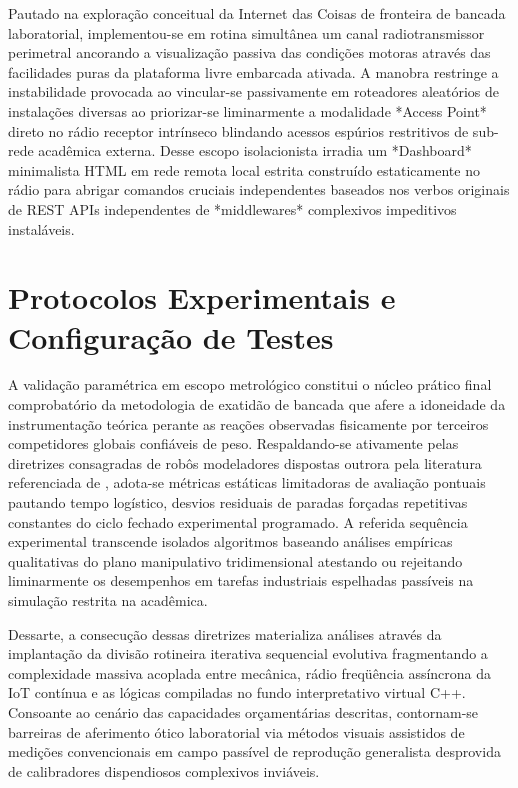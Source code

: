 Pautado na exploração conceitual da Internet das Coisas de fronteira de bancada laboratorial, implementou-se em rotina simultânea um canal radiotransmissor perimetral ancorando a visualização passiva das condições motoras através das facilidades puras da plataforma livre embarcada ativada. A manobra restringe a instabilidade provocada ao vincular-se passivamente em roteadores aleatórios de instalações diversas ao priorizar-se liminarmente a modalidade *Access Point* direto no rádio receptor intrínseco blindando acessos espúrios restritivos de sub-rede acadêmica externa. Desse escopo isolacionista irradia um *Dashboard* minimalista HTML em rede remota local estrita construído estaticamente no rádio para abrigar comandos cruciais independentes baseados nos verbos originais de REST APIs independentes de *middlewares* complexivos impeditivos instaláveis.

\section{Protocolos Experimentais e Configuração de Testes}

A validação paramétrica em escopo metrológico constitui o núcleo prático final comprobatório da metodologia de exatidão de bancada que afere a idoneidade da instrumentação teórica perante as reações observadas fisicamente por terceiros competidores globais confiáveis de peso. Respaldando-se ativamente pelas diretrizes consagradas de robôs modeladores dispostas outrora pela literatura referenciada de , adota-se métricas estáticas limitadoras de avaliação pontuais pautando tempo logístico, desvios residuais de paradas forçadas repetitivas constantes do ciclo fechado experimental programado. A referida sequência experimental transcende isolados algoritmos baseando análises empíricas qualitativas do plano manipulativo tridimensional atestando ou rejeitando liminarmente os desempenhos em tarefas industriais espelhadas passíveis na simulação restrita na acadêmica.

Dessarte, a consecução dessas diretrizes materializa análises através da implantação da divisão rotineira iterativa sequencial evolutiva fragmentando a complexidade massiva acoplada entre mecânica, rádio freqüência assíncrona da IoT contínua e as lógicas compiladas no fundo interpretativo virtual C++. Consoante ao cenário das capacidades orçamentárias descritas, contornam-se barreiras de aferimento ótico laboratorial via métodos visuais assistidos de medições convencionais em campo passível de reprodução generalista desprovida de calibradores dispendiosos complexivos inviáveis.

